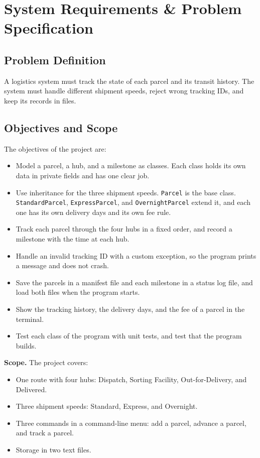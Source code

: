 \chapter{System Requirements \& Problem Specification}

\section{Problem Definition}
A logistics system must track the state of each parcel and its transit
history. The system must handle different shipment speeds, reject wrong
tracking IDs, and keep its records in files.

\section{Objectives and Scope}
The objectives of the project are:
\begin{itemize}
\item Model a parcel, a hub, and a milestone as classes. Each class holds its
own data in private fields and has one clear job.
\item Use inheritance for the three shipment speeds. \texttt{Parcel} is the
base class. \texttt{StandardParcel}, \texttt{ExpressParcel}, and
\texttt{OvernightParcel} extend it, and each one has its own delivery days and
its own fee rule.
\item Track each parcel through the four hubs in a fixed order, and record a
milestone with the time at each hub.
\item Handle an invalid tracking ID with a custom exception, so the program
prints a message and does not crash.
\item Save the parcels in a manifest file and each milestone in a status log
file, and load both files when the program starts.
\item Show the tracking history, the delivery days, and the fee of a parcel in
the terminal.
\item Test each class of the program with unit tests, and test that the
program builds.
\end{itemize}

\textbf{Scope.} The project covers:
\begin{itemize}
\item One route with four hubs: Dispatch, Sorting Facility, Out-for-Delivery,
and Delivered.
\item Three shipment speeds: Standard, Express, and Overnight.
\item Three commands in a command-line menu: add a parcel, advance a parcel,
and track a parcel.
\item Storage in two text files.
\end{itemize}


